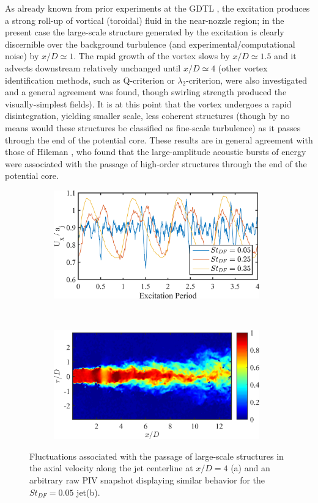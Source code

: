 As already known from prior experiments at the GDTL \citep{Kearney-Fischer2009}, the excitation produces a strong roll-up of vortical (toroidal) fluid in the near-nozzle region; in the present case the large-scale structure generated by the excitation is clearly discernible over the background turbulence (and experimental/computational noise) by $x/D \simeq 1$.
The rapid growth of the vortex slows by $x/D \simeq 1.5$ and it advects downstream relatively unchanged until  $x/D \simeq 4$ (other vortex identification methods, such as Q-criterion or $\lambda_2$-criterion, were also investigated and a general agreement was found, though swirling strength produced the visually-simplest fields).
It is at this point that the vortex undergoes a rapid disintegration, yielding smaller scale, less coherent structures (though by no means would these structures be classified as fine-scale turbulence) as it passes through the end of the potential core.
These results are in general agreement with those of Hileman \etal \citep{Hileman2005}, who found that the large-amplitude acoustic bursts of energy were associated with the passage of high-order structures through the end of the potential core.
\begin{figure}
	\centering
	\begin{subfigure}{1\textwidth}
		\centering
		\includegraphics[width=3.5in]{Figures/ch4_centerline_mach_temporal.png}
		\caption{}
		\label{fig:ch4_centerlinemach_temporal}
	\end{subfigure}\\
	\begin{subfigure}{1\textwidth}
		\centering
		\includegraphics[width=3.5in]{Figures/ch4_rawUx_acceleration.png}
		\caption{}
		\label{fig:ch4_St005_rawUx_snapshot}
	\end{subfigure}
	\caption{Fluctuations associated with the passage of large-scale structures in the axial velocity along the jet centerline at $x/D = 4$ (a) and an arbitrary raw PIV snapshot displaying similar behavior for the $St_{DF}  = 0.05$ jet(b).}
\end{figure}

